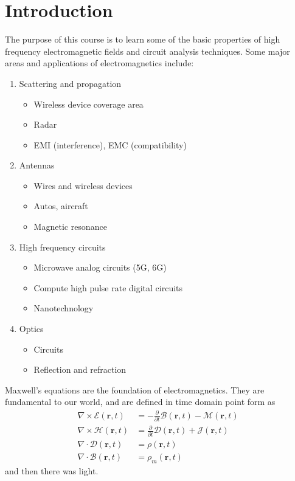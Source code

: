 \chapter{Introduction}

The purpose of this course is to learn some of the basic properties of high frequency electromagnetic fields
and circuit analysis techniques. Some major areas and applications of electromagnetics include:

\begin{enumerate}
    \item Scattering and propagation
    \begin{itemize}
        \item Wireless device coverage area
        \item Radar
        \item EMI (interference), EMC (compatibility)
    \end{itemize}
    \item Antennas
    \begin{itemize}
        \item Wires and wireless devices
        \item Autos, aircraft
        \item Magnetic resonance
    \end{itemize}
    \item High frequency circuits
    \begin{itemize}
        \item Microwave analog circuits (5G, 6G)
        \item Compute high pulse rate digital circuits
        \item Nanotechnology
    \end{itemize}
    \item Optics
    \begin{itemize}
        \item Circuits
        \item Reflection and refraction
    \end{itemize}
\end{enumerate}

\pagebreak 

Maxwell's equations are the foundation of electromagnetics. They are fundamental to our world, and are defined in time domain point form as
\begin{align}
\nabla \times \bm{\mathcal{E}} (\mathbf{r}, t) &= - \frac{\partial}{\partial t} \bm{\mathcal{B}} (\mathbf{r}, t) - \bm{\mathcal{M}} (\mathbf{r}, t) \label{eq.1} \\
\nabla \times \bm{\mathcal{H}} (\mathbf{r}, t) &= \frac{\partial}{\partial t} \bm{\mathcal{D}} (\mathbf{r}, t) + \bm{\mathcal{J}} (\mathbf{r}, t) \label{eq.2} \\
\nabla \cdot \bm{\mathcal{D}} (\mathbf{r}, t) &= \rho (\mathbf{r}, t) \label{eq.3} \\
\nabla \cdot \bm{\mathcal{B}} (\mathbf{r}, t) &= \rho_m (\mathbf{r}, t) \label{eq.4}
\end{align}
and then there was light. \vspace{\baselineskip}


